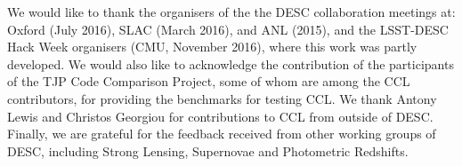 % 
We would like to thank the organisers of the the DESC collaboration meetings at:
Oxford (July 2016), SLAC (March 2016), and ANL (2015), 
and the LSST-DESC Hack Week organisers (CMU, November 2016), where this work 
was partly developed. We would also like to acknowledge the
contribution of the participants of the TJP Code Comparison Project, some of whom are among the CCL contributors, for providing the benchmarks for 
testing CCL. We thank Antony Lewis and Christos Georgiou for contributions to CCL from outside of DESC. Finally, we are grateful for the feedback received from
other working groups of DESC, including Strong Lensing, Supernovae
and Photometric Redshifts.
% 
